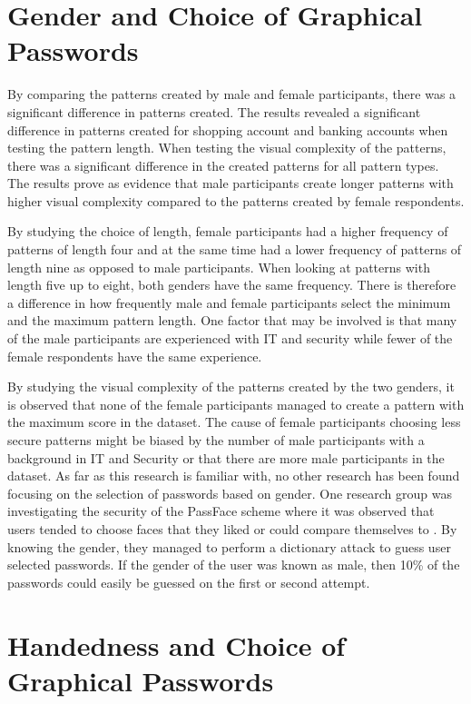   \section{Gender and Choice of Graphical Passwords}

    By comparing the patterns created by male and female participants, there was a significant difference in patterns created. The results revealed a significant difference in patterns created for shopping account and banking accounts when testing the pattern length. When testing the visual complexity of the patterns, there was a significant difference in the created patterns for all pattern types. The results prove as evidence that male participants create longer patterns with higher visual complexity compared to the patterns created by female respondents.

    By studying the choice of length, female participants had a higher frequency of patterns of length four and at the same time had a lower frequency of patterns of length nine as opposed to male participants. When looking at patterns with length five up to eight, both genders have the same frequency. There is therefore a difference in how frequently male and female participants select the minimum and the maximum pattern length. One factor that may be involved is that many of the male participants are experienced with IT and security while fewer of the female respondents have the same experience. 

    By studying the visual complexity of the patterns created by the two genders, it is observed that none of the female participants managed to create a pattern with the maximum score in the dataset.  The cause of female participants choosing less secure patterns might be biased by the number of male participants with a background in IT and Security or that there are more male participants in the dataset. As far as this research is familiar with, no other research has been found focusing on the selection of passwords based on gender. One research group was investigating the security of the PassFace scheme where it was observed that users tended to choose faces that they liked or could compare themselves to \cite{Davis}. By knowing the gender, they managed to perform a dictionary attack to guess user selected passwords. If the gender of the user was known as male, then 10\% of the passwords could easily be guessed on the first or second attempt. 

  \section{Handedness and Choice of Graphical Passwords}
    
